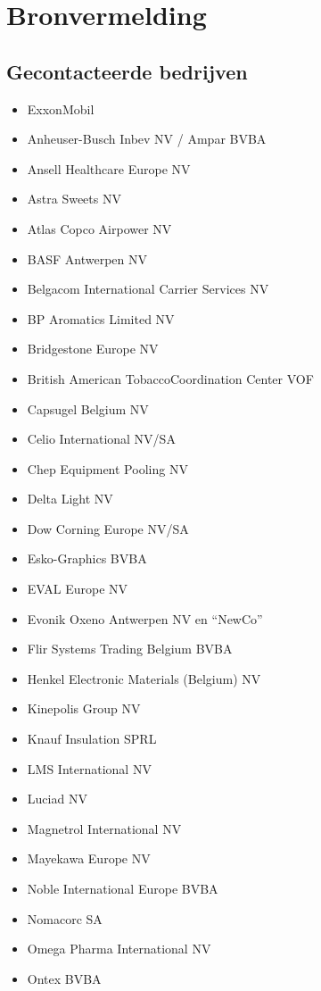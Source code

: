 \documentclass[]{article}
\begin{document}
\section{Bronvermelding}

\subsection{Gecontacteerde bedrijven}
\begin{itemize}
	\item ExxonMobil
	\item Anheuser-Busch Inbev NV / Ampar BVBA
	\item Ansell Healthcare Europe NV
	\item Astra Sweets NV
	\item Atlas Copco Airpower NV
	\item BASF Antwerpen NV
	\item Belgacom International Carrier Services NV
	\item BP Aromatics Limited NV
	\item Bridgestone Europe NV
	\item British American TobaccoCoordination Center VOF
	\item Capsugel Belgium NV
	\item Celio International NV/SA
	\item Chep Equipment Pooling NV
	\item Delta Light NV
	\item Dow Corning Europe NV/SA
	\item Esko-Graphics BVBA
	\item EVAL Europe NV
	\item Evonik Oxeno Antwerpen NV en “NewCo”
	\item Flir Systems Trading Belgium BVBA
	\item Henkel Electronic Materials (Belgium) NV
	\item Kinepolis Group NV
	\item Knauf Insulation SPRL
	\item LMS International NV
	\item Luciad NV
	\item Magnetrol International NV
	\item Mayekawa Europe NV
	\item Noble International Europe BVBA
	\item Nomacorc SA
	\item Omega Pharma International NV
	\item Ontex BVBA

\end{itemize}
\end{document}
